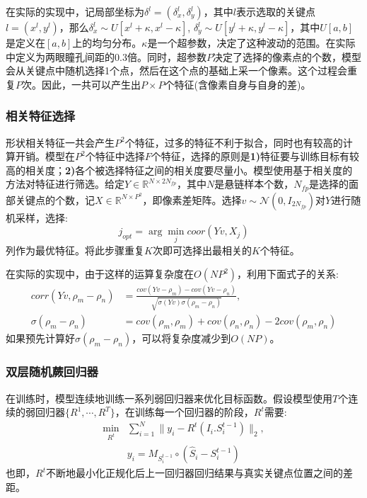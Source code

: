 在实际的实现中，记局部坐标为$\delta^l = (\delta_x^l, \delta_y^l)$，其中$l$表示选取的关键点$l = (x^l, y^l)$，那么$\delta_x^l \sim U[x^l + \kappa, x^l - \kappa]$, $\delta_y^l \sim U[y^l + \kappa, y^l - \kappa]$，其中$U[a,b]$是定义在$[a,b]$上的均匀分布。$\kappa$是一个超参数，决定了这种波动的范围。在实际中定义为两眼瞳孔间距的0.3倍。同时，超参数$P$决定了选择的像素点的个数，模型会从关键点中随机选择1个点，然后在这个点的基础上采一个像素。这个过程会重复$P$次。因此，一共可以产生出$P \times P$个特征(含像素自身与自身的差)。

\subsubsection{相关特征选择}

形状相关特征一共会产生$P^2$个特征，过多的特征不利于拟合，同时也有较高的计算开销。模型在$P^2$个特征中选择$F$个特征，选择的原则是\textbf{1)}特征要与训练目标有较高的相关度；\textbf{2)}各个被选择特征之间的相关度要尽量小。模型使用基于相关度的方法对特征进行筛选。给定$Y \in \mathbb{R}^{N\times 2N_{fp}}$，其中$N$是悬链样本个数，$N_{fp}$是选择的面部关键点的个数，记$X \in \mathbb{R}^{N\times P^2}$，即像素差矩阵。选择$v\sim\mathcal{N}(0, I_{2N_{fp}})$对$Y$进行随机采样，选择:
\[
j_{opt} = \arg\min_j coor(Yv, X_j)
\]
列作为最优特征。将此步骤重复$K$次即可选择出最相关的$K$个特征。

在实际的实现中，由于这样的运算复杂度在$O(NP^2)$，利用下面式子的关系:
\begin{align*}
	corr(Yv, \rho_m - \rho_n) &= \frac{cov(Yv - \rho_m) - cov(Yv - \rho_n)}{\sqrt{\sigma(Yv)\sigma(\rho_m-\rho_n)}},\\
	\sigma(\rho_m-\rho_n) &= cov(\rho_m, \rho_m) + cov(\rho_n, \rho_n) - 2cov(\rho_m, \rho_n)
\end{align*}
如果预先计算好$\sigma(\rho_m-\rho_n)$，可以将复杂度减少到$O(NP)$。

\subsubsection{双层随机蕨回归器}

在训练时，模型连续地训练一系列弱回归器来优化目标函数。假设模型使用$T$个连续的弱回归器$\{R^1, \cdots, R^T\}$，在训练每一个回归器的阶段，$R^t$需要:
\begin{align*}
	\min_{R^t} &\sum_{i = 1}^{N} \|y_i - R^t(I_i. S_i^{t-1})\|_2,\\
	& y_i = M_{S_i^{t-1}} \circ (\hat{S}_i - S_i^{t-1})
\end{align*}
也即，$R^t$不断地最小化正规化后上一回归器回归结果与真实关键点位置之间的差距。


